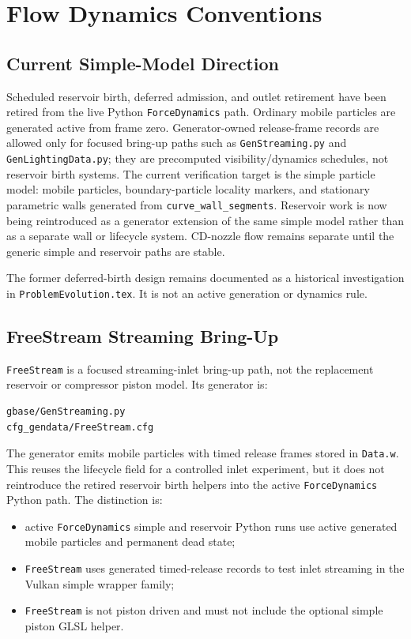 \section{Flow Dynamics Conventions}

\subsection{Current Simple-Model Direction}

Scheduled reservoir birth, deferred admission, and outlet retirement have
been retired from the live Python \texttt{ForceDynamics} path.  Ordinary
mobile particles are generated active from frame zero.  Generator-owned
release-frame records are allowed only for focused bring-up paths such as
\texttt{GenStreaming.py} and \texttt{GenLightingData.py}; they are
precomputed visibility/dynamics schedules, not reservoir birth systems.  The
current verification target is the simple particle model: mobile particles,
boundary-particle locality markers, and stationary parametric walls generated
from \texttt{curve\_wall\_segments}.  Reservoir work is now being reintroduced
as a generator extension of the same simple model rather than as a separate
wall or lifecycle system.  CD-nozzle flow remains separate until the generic
simple and reservoir paths are stable.

The former deferred-birth design remains documented as a historical
investigation in \texttt{ProblemEvolution.tex}.  It is not an active
generation or dynamics rule.

\subsection{FreeStream Streaming Bring-Up}

\texttt{FreeStream} is a focused streaming-inlet bring-up path, not the
replacement reservoir or compressor piston model.  Its generator is:
\begin{verbatim}
gbase/GenStreaming.py
cfg_gendata/FreeStream.cfg
\end{verbatim}

The generator emits mobile particles with timed release frames stored in
\texttt{Data.w}.  This reuses the lifecycle field for a controlled inlet
experiment, but it does not reintroduce the retired reservoir birth helpers
into the active \texttt{ForceDynamics} Python path.  The distinction is:
\begin{itemize}
    \item active \texttt{ForceDynamics} simple and reservoir Python runs use
          active generated mobile particles and permanent dead state;
    \item \texttt{FreeStream} uses generated timed-release records to test
          inlet streaming in the Vulkan simple wrapper family;
    \item \texttt{FreeStream} is not piston driven and must not include the
          optional simple piston GLSL helper.
\end{itemize}

